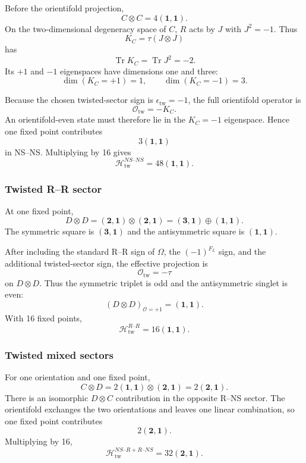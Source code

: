 \documentclass[
  10pt,
  a4paper,
  openany]{book}
\begin{document}
Before the orientifold projection, \[
C\otimes C
=
4(\mathbf1,\mathbf1).
\] On the two-dimensional degeneracy space of \(C\), \(R\) acts by \(J\)
with \(J^2=-1\). Thus \[
K_C
=
\tau(J\otimes J)
\] has \[
\operatorname{Tr}K_C
=
\operatorname{Tr}J^2
=-2.
\] Its \(+1\) and \(-1\) eigenspaces have dimensions one and three: \[
\dim(K_C=+1)=1,
\qquad
\dim(K_C=-1)=3.
\]

Because the chosen twisted-sector sign is \(\epsilon_{\mathrm{tw}}=-1\),
the full orientifold operator is \[
\mathcal O_{\mathrm{tw}}
=
-K_C.
\] An orientifold-even state must therefore lie in the \(K_C=-1\)
eigenspace. Hence one fixed point contributes \[
\boxed{
3(\mathbf1,\mathbf1)
}
\] in NS--NS. Multiplying by 16 gives \[
\boxed{
\mathcal H_{\mathrm{tw}}^{NS\text{--}NS}
=
48(\mathbf1,\mathbf1)
}.
\]

\subsubsection{Twisted R--R sector}\label{twisted-rr-sector}

At one fixed point, \[
D\otimes D
=
(\mathbf2,\mathbf1)\otimes(\mathbf2,\mathbf1)
=
(\mathbf3,\mathbf1)
\oplus
(\mathbf1,\mathbf1).
\] The symmetric square is \((\mathbf3,\mathbf1)\) and the antisymmetric
square is \((\mathbf1,\mathbf1)\).

After including the standard R--R sign of \(\Omega\), the \((-1)^{F_L}\)
sign, and the additional twisted-sector sign, the effective projection
is \[
\mathcal O_{\mathrm{tw}}
=
-\tau
\] on \(D\otimes D\). Thus the symmetric triplet is odd and the
antisymmetric singlet is even: \[
\boxed{
(D\otimes D)_{\mathcal O=+1}
=
(\mathbf1,\mathbf1)
}.
\] With 16 fixed points, \[
\boxed{
\mathcal H_{\mathrm{tw}}^{R\text{--}R}
=
16(\mathbf1,\mathbf1)
}.
\]

\subsubsection{Twisted mixed sectors}\label{twisted-mixed-sectors}

For one orientation and one fixed point, \[
C\otimes D
=
2(\mathbf1,\mathbf1)
\otimes
(\mathbf2,\mathbf1)
=
2(\mathbf2,\mathbf1).
\] There is an isomorphic \(D\otimes C\) contribution in the opposite
R--NS sector. The orientifold exchanges the two orientations and leaves
one linear combination, so one fixed point contributes \[
2(\mathbf2,\mathbf1).
\] Multiplying by 16, \[
\boxed{
\mathcal H_{\mathrm{tw}}^{NS\text{--}R+R\text{--}NS}
=
32(\mathbf2,\mathbf1)
}.
\]
\end{document}
